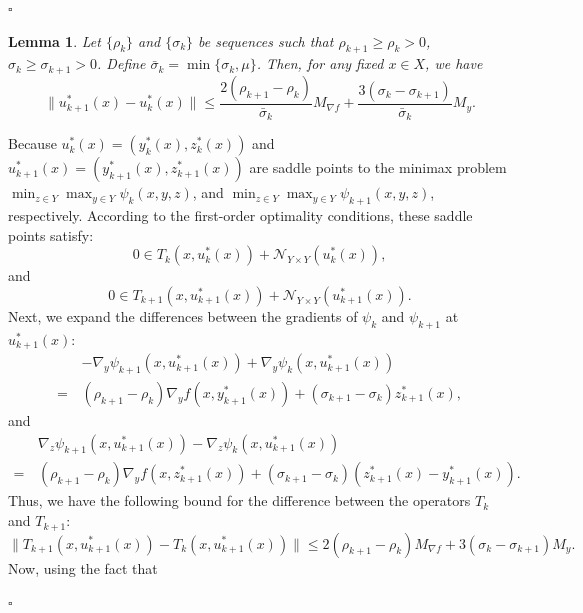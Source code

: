 \documentclass{article}
\newtheorem{lemma}[theorem]{Lemma}
\newenvironment{proof}[1][Proof]{\par
	\normalfont\topsep6pt\relax
	\trivlist\item[\hskip\labelsep\itshape #1.]\ignorespaces
}{%
	\hfill\ensuremath{\square}\endtrivlist
}
\begin{document}
\begin{proof}
	 \end{proof}


\begin{lemma}\label{uk+1uk}
	 	Let $\{\rho_k\}$ and $\{\sigma_k\}$ be sequences such that $\rho_{k+1} \ge \rho_{k}>0$, $\sigma_{k} \ge\sigma_{k+1}>0$. Define $\bar{\sigma}_k = \min\{\sigma_k, \mu\}$. Then, for any fixed $x \in X$, we have 
	 	\begin{equation}\label{uk+1ukequ}
	 		      \| u_{k+1}^*(x) - u_{k}^*(x)\| \le \frac{2 (\rho_{k+1} - \rho_k)}{\bar{\sigma}_k}M_{\nabla f} + \frac{3(\sigma_{k} - \sigma_{k+1})}{\bar{\sigma}_k}M_y.
	 	\end{equation}
	 \end{lemma}
	 \begin{proof}
Because $u_{k}^*(x) = (y_{k}^*(x), z_{k}^*(x))$ and $u_{k+1}^*(x) = (y_{k+1}^*(x), z_{k+1}^*(x))$ are saddle points to the minimax problem $\min_{z \in {Y}} \max_{ y \in {Y}}\psi_{k}(x, y, z)$, and $\min_{z \in {Y}} \max_{ y \in {Y}}\psi_{k+1}(x, y, z)$, respectively. According to the first-order optimality conditions, these saddle points satisfy:
\begin{equation}\label{lem_b3_eq1}
    0 \in T_k(x,u^*_k(x)) + \mathcal{N}_{Y \times Y}(u^*_k(x)),
\end{equation}
and 
\[
0 \in T_{k+1}(x,u^*_{k+1}(x)) + \mathcal{N}_{Y \times Y}(u^*_{k+1}(x)).
\]
Next, we expand the differences between the gradients of $\psi_{k}$ and $\psi_{k+1}$ at $u^*_{k+1}(x)$:
\[
\begin{aligned}
    &-\nabla_y \psi_{k+1}(x,u^*_{k+1}(x)) + \nabla_y \psi_{k}(x,u^*_{k+1}(x)) \\
    =\, & (\rho_{k+1} - \rho_k)\nabla_y f(x,y_{k+1}^*(x)) + (\sigma_{k+1} - \sigma_k)z_{k+1}^*(x),
\end{aligned}
\]
and
\[
\begin{aligned}
    &\nabla_z \psi_{k+1}(x,u^*_{k+1}(x)) - \nabla_z \psi_{k}(x,u^*_{k+1}(x)) \\
    = \,&(\rho_{k+1} - \rho_k)\nabla_y f(x,z_{k+1}^*(x)) + (\sigma_{k+1} - \sigma_k) \left( z_{k+1}^*(x) - y_{k+1}^*(x) \right).
\end{aligned}
\]
Thus, we have the following bound for the difference between the operators $T_{k}$ and $T_{k+1}$:
\begin{equation}\label{lem_b3_eq2}
\|T_{k+1}(x,u^*_{k+1}(x)) - T_{k}(x,u^*_{k+1}(x)) \| \le 2 (\rho_{k+1} - \rho_k)M_{\nabla f} + 3(\sigma_{k} - \sigma_{k+1})M_y.
\end{equation}
Now, using the fact that

\end{proof}
\end{document}
